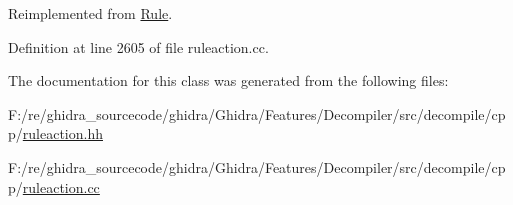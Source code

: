 Reimplemented from \mbox{\hyperlink{class_rule_a4023bfc7825de0ab866790551856d10e}{Rule}}.



Definition at line 2605 of file ruleaction.\+cc.



The documentation for this class was generated from the following files\+:\begin{DoxyCompactItemize}
\item 
F\+:/re/ghidra\+\_\+sourcecode/ghidra/\+Ghidra/\+Features/\+Decompiler/src/decompile/cpp/\mbox{\hyperlink{ruleaction_8hh}{ruleaction.\+hh}}\item 
F\+:/re/ghidra\+\_\+sourcecode/ghidra/\+Ghidra/\+Features/\+Decompiler/src/decompile/cpp/\mbox{\hyperlink{ruleaction_8cc}{ruleaction.\+cc}}\end{DoxyCompactItemize}
